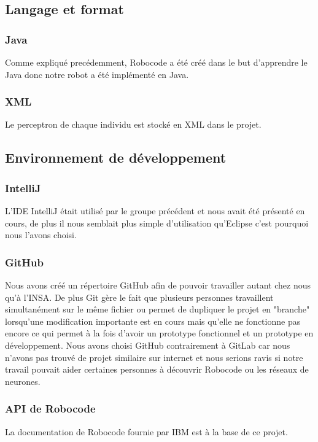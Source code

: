 \documentclass[12pt]{article}
\begin{document}
\subsection{Langage et format}

\subsubsection{Java}
Comme expliqué precédemment, Robocode a été créé dans le but d'apprendre le Java donc notre robot a été implémenté en Java.

\subsubsection{XML}
Le perceptron de chaque individu est stocké en XML dans le projet.

\subsection{Environnement de développement}

\subsubsection{IntelliJ}
L'IDE IntelliJ était utilisé par le groupe précédent et nous avait été présenté en cours, de plus il nous semblait plus simple d'utilisation qu'Eclipse c'est pourquoi nous l'avons choisi.

\subsubsection{GitHub}
Nous avons créé un répertoire GitHub afin de pouvoir travailler autant chez nous qu'à l'INSA. De plus Git gère le fait que plusieurs personnes travaillent simultanément sur le même fichier ou permet de dupliquer le projet en "branche" lorsqu'une modification importante est en cours mais qu'elle ne fonctionne pas encore ce qui permet à la fois d'avoir un prototype fonctionnel et un prototype en développement. Nous avons choisi GitHub contrairement à GitLab car nous n'avons pas trouvé de projet similaire sur internet et nous serions ravis si notre travail pouvait aider certaines personnes à découvrir Robocode ou les réseaux de neurones.

\subsubsection{API de Robocode}
La documentation de Robocode fournie par IBM est à la base de ce projet.
\end{document}
